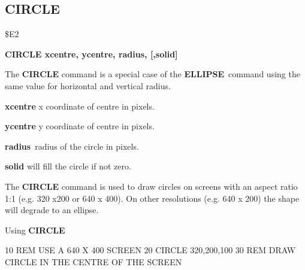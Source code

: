 \subsection{CIRCLE}
\begin{description}[leftmargin=3cm,style=nextline]
\item [Token:] \$E2
\item [Format:] {\bf CIRCLE xcentre, ycentre, radius, [,solid]}
\item [Usage:] The {\bf CIRCLE} command is a special case of
               the {\bf ELLIPSE} command using the same value for
               horizontal and vertical radius.

               {\bf xcentre} x coordinate of centre in pixels.

               {\bf ycentre} y coordinate of centre in pixels.

               {\bf radius} radius of the circle in pixels.

               {\bf solid} will fill the circle if not zero.

\item [Remarks:] The {\bf CIRCLE} command is used to draw circles on
               screens with an aspect ratio 1:1 (e.g. 320 x200
               or 640 x 400). On other resolutions (e.g. 640 x 200)
               the shape will degrade to an ellipse.

\item [Example:] Using {\bf CIRCLE}
\begin{screenoutput}
10 REM USE A 640 X 400 SCREEN
20 CIRCLE 320,200,100
30 REM DRAW CIRCLE IN THE CENTRE OF THE SCREEN
\end{screenoutput}
\end{description}


\newpage
